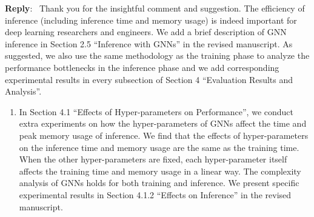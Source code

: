 \documentclass[12pt]{article}
\newenvironment{reply}
   {\medskip \noindent \textbf{Reply}:\  }
   {\medskip}
\begin{document}
\begin{reply}
    Thank you for the insightful comment and suggestion.
    The efficiency of inference (including inference time and memory usage) is indeed important for deep learning researchers and engineers.
    We add a brief description of GNN inference in Section 2.5 ``Inference with GNNs'' in the revised manuscript.
    As suggested, we also use the same methodology as the training phase to analyze the performance bottlenecks in the inference phase and we add corresponding experimental results in every subsection of Section 4 ``Evaluation Results and Analysis''.
    \begin{enumerate}
    
    \item In Section 4.1 ``Effects of Hyper-parameters on Performance'', we conduct extra experiments on how the hyper-parameters of GNNs affect the time and peak memory usage of inference.
    We find that the effects of hyper-parameters on the inference time and memory usage are the same as the training time.
    When the other hyper-parameters are fixed, each hyper-parameter itself affects the training time and memory usage in a linear way.
    The complexity analysis of GNNs holds for both training and inference.
    We present specific experimental results in Section 4.1.2 ``Effects on Inference'' in the revised manuscript.
    

\end{enumerate}
\end{reply}
\end{document}
